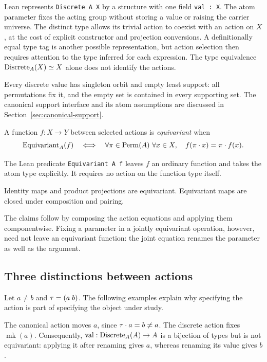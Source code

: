 Lean represents \texttt{Discrete A X} by a structure with one field
\texttt{val : X}. The atom parameter fixes the acting group without storing
a value or raising the carrier universe. The distinct type
allows its trivial action to coexist with an action on $X$, at the cost
of explicit constructor and projection conversions. A definitionally equal
type tag is another possible representation, but action selection then
requires attention to the type inferred for each expression. The type
equivalence $\operatorname{Discrete}_A(X)\simeq X$ alone does not identify the actions.

Every discrete value has singleton orbit and empty least support: all
permutations fix it, and the empty set is contained in every supporting set.
The canonical support interface and its atom assumptions are discussed in
Section~\ref{sec:canonical-support}.

\begin{definition}
A function $f:X\to Y$ between selected actions is \emph{equivariant} when
\[
  \operatorname{Equivariant}_A(f)\quad\Longleftrightarrow\quad
  \forall\pi\in\operatorname{Perm}(A)\ \forall x\in X,\quad
  f(\pi\mathbin{\cdot} x)=\pi\mathbin{\cdot} f(x).
\]
\end{definition}

The Lean predicate \texttt{Equivariant A f} leaves $f$ an ordinary
function and takes the atom type explicitly. It requires no action on the
function type itself.

\begin{proposition}
\label{prop:equivariant}
Identity maps and product projections are equivariant. Equivariant maps
are closed under composition and pairing.
\end{proposition}

The claims follow by composing the action equations and applying them
componentwise. Fixing a parameter in a jointly equivariant operation,
however, need not leave an equivariant function: the joint equation
renames the parameter as well as the argument.

\subsection{Three distinctions between actions}
\label{sec:counterexamples}

Let $a\ne b$ and $\tau=(a\;b)$. The following examples explain why
specifying the action is part of specifying the object under study.

\begin{example}
\label{ex:discrete}
The canonical action moves $a$, since $\tau\mathbin{\cdot} a=b\ne a$.
The discrete action fixes $\operatorname{mk}(a)$.
Consequently, $\operatorname{val}:\operatorname{Discrete}_A(A)\to A$ is a bijection of
types but is not equivariant: applying it after renaming gives $a$, whereas
renaming its value gives $b$.
\end{example}

